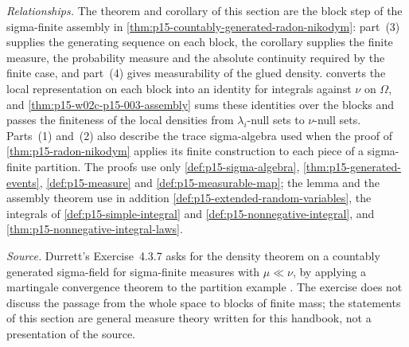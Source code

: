 \emph{Relationships.} The theorem and corollary of this section are the
block step of the sigma-finite assembly in
\cref{thm:p15-countably-generated-radon-nikodym}: part~(3) supplies the
generating sequence on each block, the corollary supplies the finite
measure, the probability measure and the absolute continuity required by
the finite case, and part~(4) gives measurability of the glued density.
 converts the local
representation on each block into an identity for integrals against
\(\nu\) on \(\Omega\), and \cref{thm:p15-w02c-p15-003-assembly}
sums these identities over the blocks and passes the finiteness of the
local densities from \(\lambda_i\)-null sets to \(\nu\)-null sets.
Parts~(1) and~(2) also describe the trace sigma-algebra used when the
proof of \cref{thm:p15-radon-nikodym} applies its finite construction to
each piece of a sigma-finite partition. The proofs use only
\cref{def:p15-sigma-algebra}, \cref{thm:p15-generated-events},
\cref{def:p15-measure} and \cref{def:p15-measurable-map}; the lemma and
the assembly theorem use in addition \cref{def:p15-extended-random-variables},
the integrals of \cref{def:p15-simple-integral} and
\cref{def:p15-nonnegative-integral}, and \cref{thm:p15-nonnegative-integral-laws}.

\emph{Source.} Durrett's Exercise~4.3.7 asks for the density theorem on a
countably generated sigma-field for sigma-finite measures with
\(\mu\ll\nu\), by applying a martingale convergence theorem to the
partition example \cite[exercise~4.3.7, p.~234]{DurrettPTEAuthor2019}. The
exercise does not discuss the passage from the whole space to blocks of
finite mass; the statements of this section are general measure theory
written for this handbook, not a presentation of the source.
